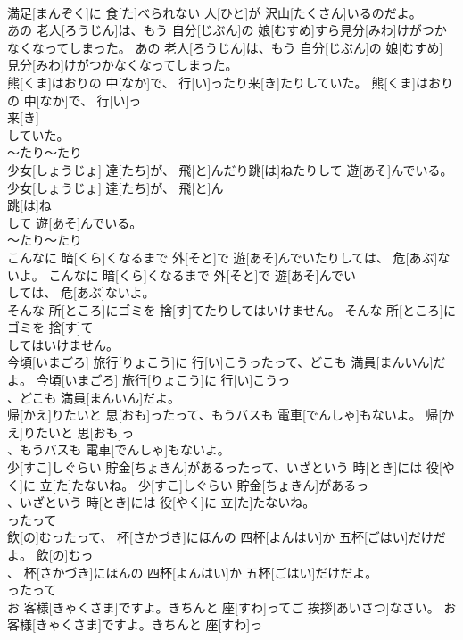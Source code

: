 \documentclass[8pt]{extreport}
\begin{document}
\begin{CJK}{UTF8}{min}
\\	満足[まんぞく]に 食[た]べられない 人[ひと]が 沢山[たくさん]いるのだよ。	
\\	あの 老人[ろうじん]は、もう 自分[じぶん]の 娘[むすめ]すら見分[みわ]けがつかなくなってしまった。	あの 老人[ろうじん]は、もう 自分[じぶん]の 娘[むすめ]
\\	見分[みわ]けがつかなくなってしまった。	
\\	熊[くま]はおりの 中[なか]で、 行[い]ったり来[き]たりしていた。	熊[くま]はおりの 中[なか]で、 行[い]っ
\\	来[き]
\\	していた。	
\\	～たり～たり 
\\	少女[しょうじょ] 達[たち]が、 飛[と]んだり跳[は]ねたりして 遊[あそ]んでいる。	少女[しょうじょ] 達[たち]が、 飛[と]ん
\\	跳[は]ね
\\	して 遊[あそ]んでいる。	
\\	～たり～たり 
\\	こんなに 暗[くら]くなるまで 外[そと]で 遊[あそ]んでいたりしては、 危[あぶ]ないよ。	こんなに 暗[くら]くなるまで 外[そと]で 遊[あそ]んでい
\\	しては、 危[あぶ]ないよ。	
\\	そんな 所[ところ]にゴミを 捨[す]てたりしてはいけません。	そんな 所[ところ]にゴミを 捨[す]て
\\	してはいけません。	
\\	今頃[いまごろ] 旅行[りょこう]に 行[い]こうったって、どこも 満員[まんいん]だよ。	今頃[いまごろ] 旅行[りょこう]に 行[い]こうっ
\\	、どこも 満員[まんいん]だよ。	
\\	帰[かえ]りたいと 思[おも]ったって、もうバスも 電車[でんしゃ]もないよ。	帰[かえ]りたいと 思[おも]っ
\\	、もうバスも 電車[でんしゃ]もないよ。	
\\	少[すこ]しぐらい 貯金[ちょきん]があるったって、いざという 時[とき]には 役[やく]に 立[た]たないね。	少[すこ]しぐらい 貯金[ちょきん]があるっ
\\	、いざという 時[とき]には 役[やく]に 立[た]たないね。	
\\	ったって
\\	飲[の]むったって、 杯[さかづき]にほんの 四杯[よんはい]か 五杯[ごはい]だけだよ。	飲[の]むっ
\\	、 杯[さかづき]にほんの 四杯[よんはい]か 五杯[ごはい]だけだよ。	
\\	ったって
\\	お 客様[きゃくさま]ですよ。きちんと 座[すわ]ってご 挨拶[あいさつ]なさい。	お 客様[きゃくさま]ですよ。きちんと 座[すわ]っ

\end{CJK}
\end{document}
